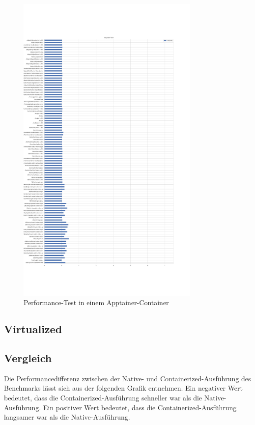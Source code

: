 \begin{figure}[h!]
    \centering
    \includegraphics[width=0.8\textwidth]{benchmark/vis/apptainer/elapsed.png}
    \caption{Performance-Test in einem Apptainer-Container}
    \label{fig:apptainer}
\end{figure}
\FloatBarrier

\subsection{Virtualized}


\subsection{Vergleich}

Die Performancedifferenz zwischen der Native- und Containerized-Ausführung des Benchmarks lässt sich aus der folgenden Grafik entnehmen. Ein negativer Wert bedeutet, dass die Containerized-Ausführung schneller war als die Native-Ausführung. Ein positiver Wert bedeutet, dass die Containerized-Ausführung langsamer war als die Native-Ausführung.

